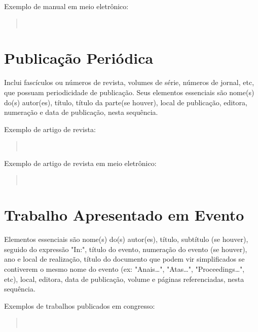 \documentclass[repeatfields,xlists,xpacks,oneside]{ufrgscca}
\begin{document}
\begin{appendix}
Exemplo de manual em meio eletrônico:\\

\begin{quote}\noindent{}\\\end{quote}


\section{Publicação Periódica}

Inclui fascículos ou números de revista, volumes de série, números de
jornal, etc, que possuam periodicidade de publicação. Seus elementos
essenciais são nome(s) do(s) autor(es), título, título da parte(se houver),
local de publicação, editora, numeração e data de publicação, nesta
sequência.

Exemplo de artigo de revista:\\

\begin{quote}\noindent{}\\\end{quote}

Exemplo de artigo de revista em meio eletrônico:\\

\begin{quote}\noindent{}\\\end{quote}



\section{Trabalho Apresentado em Evento}

Elementos essenciais são nome(s) do(s) autor(es), título, subtítulo (se
houver), seguido do expressão "In:", título do evento, numeração do evento
(se houver), ano e local de realização, título do documento que podem vir
simplificados se contiverem o mesmo nome do evento (ex: "Anais\ldots",
"Atas\ldots", "Proceedings\ldots", etc), local, editora, data de publicação,
volume e páginas referenciadas, nesta sequência.

Exemplos de trabalhos publicados em congresso:\\

\begin{quote}\noindent{}\\\end{quote}


\end{appendix}
\end{document}
